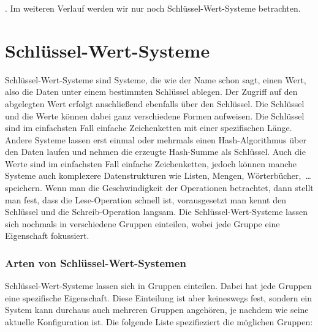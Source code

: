 . Im weiteren Verlauf werden wir nur noch Schlüssel-Wert-Systeme betrachten.

\section{Schlüssel-Wert-Systeme}
Schlüssel-Wert-Systeme sind Systeme, die wie der Name schon sagt, einen Wert,
also die Daten unter einem bestimmten Schlüssel ablegen. Der Zugriff auf den
abgelegten Wert erfolgt anschließend ebenfalls über den Schlüssel. Die Schlüssel
und die Werte können dabei ganz verschiedene Formen aufweisen. Die Schlüssel
sind im einfachsten Fall einfache Zeichenketten mit einer spezifischen Länge.
Andere Systeme lassen erst einmal oder mehrmals einen Hash-Algorithmus über den
Daten laufen und nehmen die erzeugte Hash-Summe als Schlüssel. Auch die Werte
sind im einfachsten Fall einfache Zeichenketten, jedoch können manche Systeme
auch komplexere Datenstrukturen wie Listen, Mengen, Wörterbücher,~\dots{}
speichern. Wenn man die Geschwindigkeit der Operationen betrachtet, dann stellt
man fest, dass die Lese-Operation schnell ist, vorausgesetzt man kennt den
Schlüssel und die Schreib-Operation langsam. Die Schlüssel-Wert-Systeme lassen
sich nochmals in verschiedene Gruppen einteilen, wobei jede Gruppe eine
Eigenschaft fokussiert.

\subsubsection{Arten von Schlüssel-Wert-Systemen}
Schlüssel-Wert-Systeme lassen sich in Gruppen einteilen. Dabei hat jede Gruppen
eine spezifische Eigenschaft. Diese Einteilung ist aber keineswegs fest, sondern
ein System kann durchaus auch mehreren Gruppen angehören, je nachdem wie seine
aktuelle Konfiguration ist. Die folgende Liste spezifieziert die möglichen
Gruppen:


